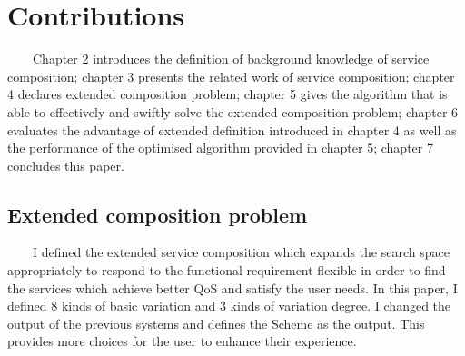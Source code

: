 \documentclass[senior,final,11pt]{iscs-thesis}
\begin{document}
\section{Contributions}
~~~~Chapter 2 introduces the definition of background knowledge of service composition; chapter 3 presents the related work of service composition; chapter 4 declares extended composition problem; chapter 5 gives the algorithm that is able to effectively and swiftly solve the extended composition problem; chapter 6 evaluates the advantage of extended definition introduced in chapter 4 as well as the performance of the optimised algorithm provided in chapter 5; chapter 7 concludes this paper.
\subsection{Extended composition problem}
~~~~I defined the extended service composition which expands the search space appropriately to respond to the functional requirement flexible in order to find the services which achieve better QoS and satisfy the user needs. In this paper, I defined 8 kinds of basic variation and 3 kinds of variation degree. 
I changed the output of the previous systems and defines the Scheme as the output. This provides more choices for the user to enhance their experience.
\end{document}
